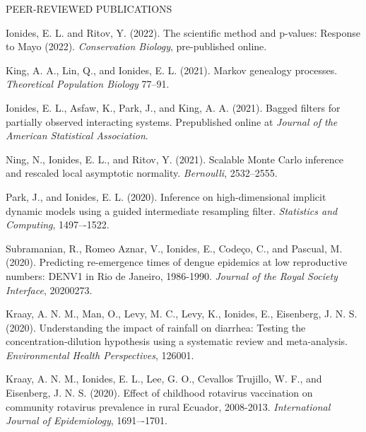 \begin{reflist}{PEER-REVIEWED PUBLICATIONS}


\item Ionides, E. L. and Ritov, Y. (2022). The scientific method and p-values: Response to Mayo (2022). {\em Conservation Biology}, pre-published online.

\item  King, A. A., Lin, Q., and Ionides, E. L. (2021). Markov genealogy processes. {\em Theoretical Population Biology} {}{\separator}77--91.
  
\item  Ionides, E. L., Asfaw, K., Park, J., and King, A. A. (2021). Bagged filters for partially observed interacting systems. Prepublished online at {\em Journal of the American Statistical Association}. 

\item Ning, N., Ionides, E. L., and Ritov, Y. (2021). Scalable Monte Carlo inference and rescaled local asymptotic normality. {\em Bernoulli}, {}{\separator}2532--2555.
  
  \item Park, J., and Ionides, E. L. (2020). Inference on high-dimensional implicit dynamic models using a guided intermediate resampling filter. {\em Statistics and Computing}, {}{\separator}1497–-1522.

\item Subramanian, R., Romeo Aznar, V., Ionides, E., Code{\c c}o, C., and Pascual, M. (2020). Predicting re-emergence times of dengue epidemics at low reproductive numbers: DENV1 in Rio de Janeiro, 1986-1990. {\em Journal of the Royal Society Interface}, {}{\separator}20200273. 

\item Kraay, A. N. M., Man, O., Levy, M. C., Levy, K., Ionides, E., Eisenberg, J. N. S. (2020). Understanding the impact of rainfall on diarrhea: Testing the concentration-dilution hypothesis using a systematic review and meta-analysis. {\em Environmental Health Perspectives}, {}{\separator}126001.
  
\item Kraay, A. N. M., Ionides, E. L., Lee, G. O., Cevallos Trujillo, W. F., and Eisenberg, J. N. S. (2020). Effect of childhood rotavirus vaccination on community rotavirus prevalence in rural Ecuador, 2008-2013. {\em International Journal of Epidemiology}, {}{\separator}1691–-1701.
  

\end{reflist}

